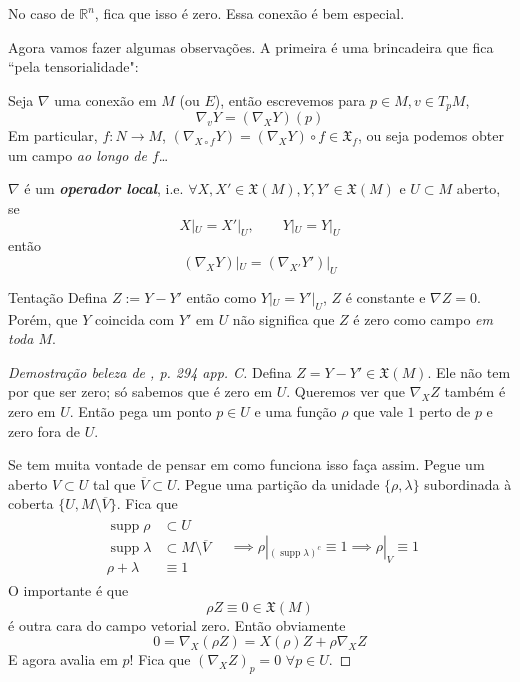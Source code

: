 No caso de \(\mathbb{R}^n\), fica que isso é zero. Essa conexão é bem especial.

Agora vamos fazer algumas observações. A primeira é uma brincadeira que fica ``pela tensorialidade":

Seja \(\nabla\) uma conexão em \(M\) (ou \(E\)), então escrevemos para \(p \in M, v \in T_pM\),
\[\nabla_v Y = (\nabla_X Y)(p)\]
Em particular, \(f :N \to M\), \((\nabla_{X \circ f}Y)=(\nabla_XY)\circ f\in \mathfrak{X}_f\), ou seja podemos obter um campo \textit{ao longo de \(f\)}…  
\begin{prop}\leavevmode
\(\nabla\) é um \textit{\textbf{operador local}}, i.e. \(\forall  X,X' \in \mathfrak{X}(M), Y,Y' \in \mathfrak{X}(M)\) e \(U \subset M\) aberto, se
\[X|_{ U}=X'|_{U},\qquad Y|_{U}=Y|_{U}\]
então
\[(\nabla_XY)|_{U}=(\nabla_{X'}Y')|_{U}\]
\end{prop}
\begin{thing7}{Tentação}\leavevmode
Defina \(Z:=Y-Y'\)  então como \(Y|_{ U}=Y'|_{U}\), \(Z\) é constante e \(\nabla Z=0\). Porém, que \(Y\) coincida com \(Y'\) em \(U\) não significa que \(Z\) é zero como campo \textit{em toda \(M\)}. 
\end{thing7}
\begin{proof}[Demostração beleza de \cite{milnorch}, p. 294 app. C]\leavevmode
Defina \(Z=Y-Y' \in \mathfrak{X}(M)\). Ele não tem por que ser zero; só sabemos que é zero em \(U\). Queremos ver que \(\nabla_XZ\) também é zero em \(U\). Então pega um ponto \(p \in U\) e uma função \(\rho\) que vale \(1\) perto de \(p\) e zero fora de \(U\).

{\color{7}Se tem muita vontade de pensar em como funciona isso faça assim. Pegue um aberto \(V \subset U\) tal que \(\overline{V}\subset U\). Pegue uma partição da unidade \(\{\rho,\lambda\}\) subordinada à coberta \(\{U,M\setminus \overline{V}\}\). Fica que
\begin{align*}
\begin{aligned}
\operatorname{supp}\rho &  \subset U\\
\operatorname{supp}\lambda &  \subset M\setminus \overline{V}\\
\rho+\lambda & \equiv 1
\end{aligned}
\quad \implies \rho |_{(\operatorname{supp}\lambda)^c}\equiv 1 \implies \rho |_{V}\equiv 1
\end{align*}}
O importante é que
\[\rho Z \equiv 0 \in \mathfrak{X}(M)\]
é outra cara do campo vetorial zero. Então obviamente
\[0=\nabla_X(\rho Z)=X(\rho)Z+\rho \nabla_XZ\]
E agora avalia em \(p\)! Fica que \((\nabla_XZ)_p=0\) \(\forall  p \in U\).
\end{proof}
